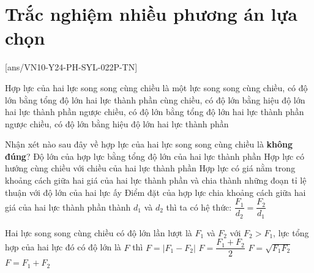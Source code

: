 \let\lesson\undefined
\newcommand{\lesson}{\phantomlesson{Bài 13.}}
\setcounter{section}{2}
\section{Trắc nghiệm nhiều phương án lựa chọn}
\setcounter{ex}{0}
[ans/VN10-Y24-PH-SYL-022P-TN]
\begin{ex}
	Hợp lực của hai lực song song cùng chiều là một lực song song
	\choice
	{\True cùng chiều, có độ lớn bằng tổng độ lớn hai lực thành phần}
	{cùng chiều, có độ lớn bằng hiệu độ lớn hai lực thành phần}
	{ngược chiều, có độ lớn bằng tổng độ lớn hai lực thành phần}
	{ngược chiều, có độ lớn bằng hiệu độ lớn hai lực thành phần}
\end{ex}
\begin{ex}
	Nhận xét nào sau đây về hợp lực của hai lực song song cùng chiều là \textbf{không đúng}?
	\choice
	{Độ lớn của hợp lực bằng tổng độ lớn của hai lực thành phần}
	{Hợp lực có hướng cùng chiều với chiều của hai lực thành phần}
	{\True Hợp lực có giá nằm trong khoảng cách giữa hai giá của hai lực thành phần và chia thành những đoạn tỉ lệ thuận với độ lớn của hai lực ấy}
	{Điểm đặt của hợp lực chia khoảng cách giữa hai giá của hai lực thành phần thành $d_1$ và $d_2$ thì ta có hệ thức: $\dfrac{F_1}{d_2}=\dfrac{F_2}{d_1}$}
\end{ex}
\begin{ex}
Hai lực song song cùng chiều có độ lớn lần lượt là $F_1$ và $F_2$ với $F_2>F_1$, lực tổng hợp của hai lực đó có độ lớn là $F$ thì	
	\choice
	{$F=\left|F_1-F_2\right|$}
	{$F=\dfrac{F_1+F_2}{2}$}
	{$F=\sqrt{F_1F_2}$}
	{\True $F=F_1+F_2$}
	\loigiai{}
\end{ex}
